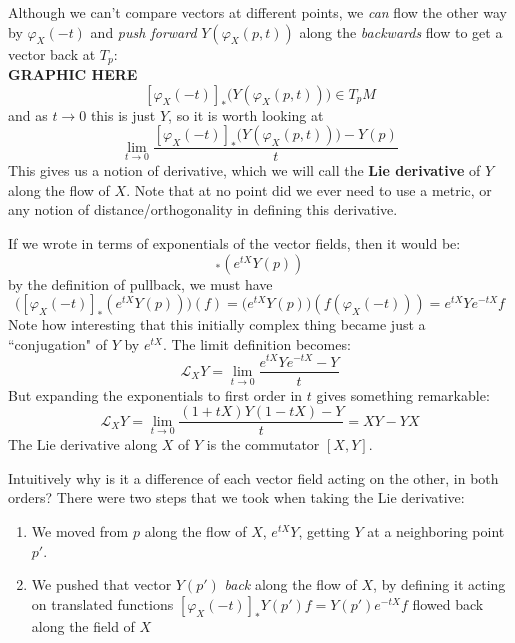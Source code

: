 		Although we can't compare vectors at different points, we \emph{can} flow the other way by $\varphi_{X}(-t)$ and \emph{push forward} $Y(\varphi_X (p,t))$ along the \emph{backwards} flow to get a vector back at $T_p$:
\\		\textbf{GRAPHIC HERE}
		\begin{equation}\label{eq:pushforward_backwards}
			[\varphi_X(-t)]_* \big(Y(\varphi_X(p, t))\big) \in T_pM
		\end{equation}
		and as $t \rightarrow 0$ this is just $Y$, so it is worth looking at
		\begin{equation*}
			\lim_{t \rightarrow 0} \frac{[\varphi_X(-t)]_* \big(Y(\varphi_X(p, t))\big)-Y(p)}{t}
		\end{equation*}
		This gives us a notion of derivative, which we will call the \textbf{Lie derivative} of $Y$ along the flow of $X$. Note that at no point did we ever need to use a metric, or any notion of distance/orthogonality in defining this derivative.
		 
		If we wrote \label{eq:pushforward_backwards} in terms of exponentials of the vector fields, then it would be:
		\begin{equation*}
			 [\varphi_X(-t)]_* (e^{tX} Y(p))
		\end{equation*}
		by the definition of pullback, we must have 
		\begin{equation*}
			\Big([\varphi_X(-t)]_* (e^{tX} Y(p)) \Big) (f) = \big(e^{tX} Y(p) \big) (f(\varphi_X(-t))) = e^{tX} Y e^{-tX} f
		\end{equation*}
		Note how interesting that this initially complex thing became just a ``conjugation" of $Y$ by $e^{tX}$. The limit definition becomes:
		\begin{equation}
			\mathcal L_X Y = \lim_{t \rightarrow 0} 
			\frac{e^{tX} Y e^{-tX} - Y}{t}
		\end{equation}
		But expanding the exponentials to first order in $t$ gives something remarkable:
		\begin{equation}
			\mathcal L_X Y = \lim_{t \rightarrow 0} \frac{(1+tX)Y(1-tX) - Y}{t} = XY-YX
		\end{equation}
		The Lie derivative along $X$ of $Y$ is the commutator $[X,Y]$. 
		
		Intuitively why is it a difference of each vector field acting on the other, in both orders? There were two steps that we took when taking the Lie derivative:
		\begin{enumerate}
			\item We moved from $p$ along the flow of $X$, $e^{tX} Y$, getting $Y$ at a neighboring point $p'$.
			\item We pushed that vector $Y(p')$ \emph{back} along the flow of $X$, by defining it acting on translated functions $[\varphi_X(-t)]_* Y(p') f = Y(p') e^{-tX} f$ flowed back along the field of $X$
		\end{enumerate}
		
